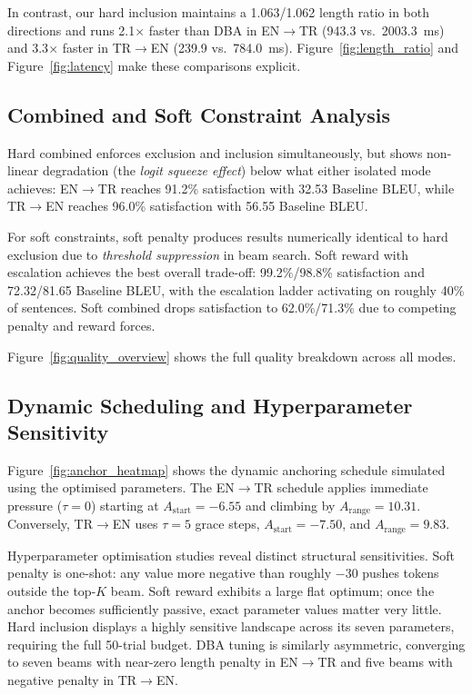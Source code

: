 \documentclass{CUP-JNL-NLP}
\begin{document}
In contrast, our hard inclusion maintains a 1.063/1.062 length ratio in both
directions and runs 2.1$\times$ faster than DBA in EN$\rightarrow$TR (943.3
vs.\ 2003.3~ms) and 3.3$\times$ faster in TR$\rightarrow$EN (239.9 vs.\ 784.0~ms).
Figure~\ref{fig:length_ratio} and Figure~\ref{fig:latency} make these comparisons
explicit.

\subsection{Combined and Soft Constraint Analysis}

Hard combined enforces exclusion and inclusion simultaneously, but shows non-linear
degradation (the \emph{logit squeeze effect}) below what either isolated mode
achieves: EN$\rightarrow$TR reaches 91.2\% satisfaction with 32.53 Baseline BLEU,
while TR$\rightarrow$EN reaches 96.0\% satisfaction with 56.55 Baseline BLEU.

For soft constraints, soft penalty produces results numerically identical to hard
exclusion due to \emph{threshold suppression} in beam search. Soft reward with
escalation achieves the best overall trade-off: 99.2\%/98.8\% satisfaction and
72.32/81.65 Baseline BLEU, with the escalation ladder activating on roughly 40\% of
sentences. Soft combined drops satisfaction to 62.0\%/71.3\% due to competing
penalty and reward forces.

Figure~\ref{fig:quality_overview} shows the full quality breakdown across all modes.

\subsection{Dynamic Scheduling and Hyperparameter Sensitivity}

Figure~\ref{fig:anchor_heatmap} shows the dynamic anchoring schedule simulated using
the optimised parameters. The EN$\rightarrow$TR schedule applies immediate pressure
($\tau = 0$) starting at $A_{\text{start}} = -6.55$ and climbing by
$A_{\text{range}} = 10.31$. Conversely, TR$\rightarrow$EN uses $\tau = 5$ grace
steps, $A_{\text{start}} = -7.50$, and $A_{\text{range}} = 9.83$.

Hyperparameter optimisation studies reveal distinct structural sensitivities. Soft
penalty is one-shot: any value more negative than roughly $-30$ pushes tokens outside
the top-$K$ beam. Soft reward exhibits a large flat optimum; once the anchor becomes
sufficiently passive, exact parameter values matter very little. Hard inclusion
displays a highly sensitive landscape across its seven parameters, requiring the full
50-trial budget. DBA tuning is similarly asymmetric, converging to seven beams with
near-zero length penalty in EN$\rightarrow$TR and five beams with negative penalty
in TR$\rightarrow$EN.
\end{document}
